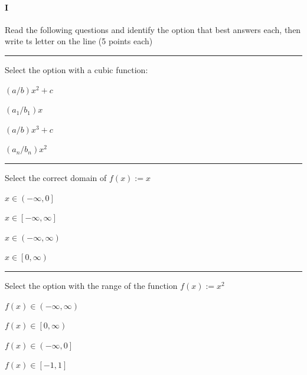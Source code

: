 
\paragraph{I} Read the following questions and identify the option that best answers each, then write ts letter on the line (5 points each)

\begin{preguntas}

\pregunta[5] \rule{1cm}{0.1mm} Select the option with a cubic function:

\begin{enumerate*}[label=(\alph*)]
    \item $(a/b)x^2 + c\qquad$
    \item $(a_1/b_1)x \qquad$
    \item $(a/b)x^3 + c\qquad$
    \item $(a_n/b_n)x^2\qquad$
\end{enumerate*}

\pregunta[5] \rule{1cm}{0.1mm} Select the correct domain of $f(x):=x$

\begin{enumerate*}[label=(\alph*)]
    \item $x\in\left(-\infty,0\right]\qquad$
    \item $x\in\left[-\infty,\infty\right]\qquad$
    \item $x\in\left(-\infty,\infty\right)\qquad$
    \item $x\in\left[0,\infty\right)\qquad$
\end{enumerate*}

\pregunta[5] \rule{1cm}{0.1mm} Select the option with the range of the function $f(x):=x^2$

\begin{enumerate*}[label=(\alph*)]
    \item $f(x)\in\left(-\infty,\infty\right)\qquad$
    \item $f(x)\in\left[0,\infty\right)\qquad$
    \item $f(x)\in\left(-\infty,0\right]\qquad$
    \item $f(x)\in\left[-1,1\right]\qquad$
\end{enumerate*}


\end{preguntas}
